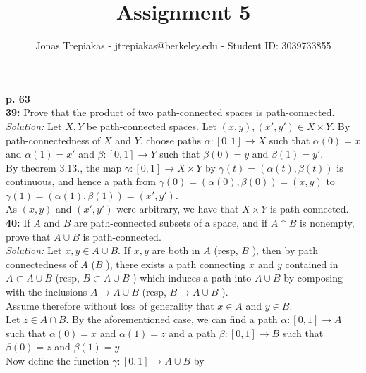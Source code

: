 \documentclass[a4paper]{article}
\title{Assignment 5}
\author{Jonas Trepiakas - jtrepiakas@berkeley.edu - Student ID: 3039733855}
\date{}
\begin{document}
\maketitle
\newpage
    \textbf{p. 63}\\
    \textbf{39:} Prove that the product of two path-connected spaces is
    path-connected.\\
    \linebreak
    \textit{Solution:} Let $X,Y$ be path-connected spaces. Let
    $(x,y), (x',y') \in X \times Y$. By path-connectedness of $X$ and $Y$,
    choose
    paths $\alpha  \colon \left[ 0,1 \right] \to X$ such that
    $\alpha (0) = x$ and $\alpha (1) = x'$ and
    $\beta  \colon \left[ 0,1 \right] \to Y$ such that
    $\beta (0) = y$ and $\beta (1) = y'$.\\
    By theorem 3.13., the map
    $\gamma  \colon \left[ 0,1 \right] \to X \times Y$ by
    $\gamma (t) = \left( \alpha (t), \beta (t) \right) $ is continuous, and
    hence a path from
    $\gamma (0) = \left( \alpha (0), \beta(0) \right) 
    = \left( x, y \right) $ to
    $\gamma (1) = \left( \alpha (1), \beta(1) \right) 
    = \left( x', y' \right) $.\\
    As $(x,y)$ and $(x',y')$ were arbitrary, we have that $X \times Y$ is
    path-connected.\\
    \linebreak
    \textbf{40:} If $A$ and $B$ are path-connected subsets of a space, and if
    $A \cap B$ is nonempty, prove that $A \cup B$ is path-connected.\\
    \linebreak
    \textit{Solution:} Let $x,y \in A \cup B$. If $x,y$ are both in $A$ (resp,
    $B$ ), then by path connectedness of $A$ ($B$ ), there exists a path
    connecting $x$ and $y$ contained in $A \subset A \cup B$ (resp, $B \subset
    A \cup B$ ) which induces a path into $A \cup B$ by composing with the
    inclusions $ A \to A\cup B$ (resp, $B \to A\cup B$ ).\\
    \linebreak
    Assume therefore without loss of generality that $x \in A$ and $y \in B$.\\
    Let $z \in  A \cap B$. By the aforementioned case, we can find a path
    $\alpha  \colon \left[ 0,1 \right] \to A$ such that $\alpha(0) = x$ and
    $\alpha (1) = z$ and a path
    $\beta  \colon \left[ 0,1 \right] \to B$ such that
    $\beta (0) = z$ and $\beta (1) = y$.\\
    Now define the function $\gamma  \colon \left[ 0,1 \right] \to A \cup B$ by
\end{document}

